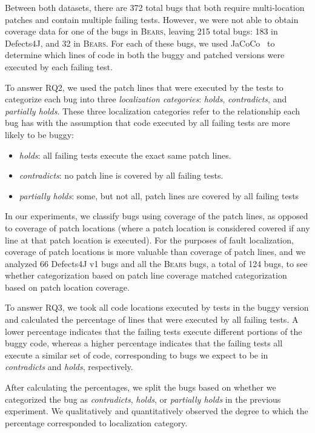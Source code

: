 \documentclass[10pt, conference]{IEEEtran}
\newcommand\bears{\textsc{Bears}\xspace}
\begin{document}
Between both datasets, there are 372 total bugs that both require multi-location
patches and contain multiple failing tests. However, we were not able to obtain coverage 
data for one of the bugs in \bears, leaving 215 total bugs: 183 in Defects4J, and 32 in
\bears. 
For each of these bugs, we used JaCoCo~\cite{jacoco}
to determine which lines of code in both the buggy and patched versions were executed
by each failing test.

To answer RQ2, we used the patch lines that were executed by the tests to categorize 
each bug into three \emph{localization categories}: \emph{holds}, \emph{contradicts}, and 
\emph{partially holds}. These three localization categories refer to the relationship each bug has 
with 
the assumption that code executed by all failing tests are more likely to be buggy: 

\begin{itemize}
\item \emph{holds}:  all failing tests execute the exact same patch lines.
\item \emph{contradicts}: no patch line is covered by all failing tests.
\item \emph{partially holds}: some, but not all, patch lines are covered by all failing tests
\end{itemize}

In our experiments, we classify bugs using coverage of the patch lines, as opposed to 
coverage of 
patch locations (where a patch location is considered covered if any line at that patch location 
is 
executed). For the purposes of fault localization, coverage of patch locations is more valuable 
than coverage of patch lines, and we analyzed 66 Defects4J v1 bugs
 and all the \bears bugs, a total of 124 bugs, to see whether categorization 
based on patch line 
coverage matched categorization based on patch location coverage.

To answer RQ3, we took all code locations executed by tests in the buggy version and
calculated the percentage of lines that were executed by all failing tests. 
A lower percentage indicates that the failing tests execute different portions of the buggy 
code, whereas a higher percentage indicates that the failing tests all execute a similar
set of code, corresponding to bugs we expect to be in \emph{contradicts} and \emph{holds},
respectively.

After calculating the percentages, we split the bugs based on whether we categorized the bug 
as \emph{contradicts}, \emph{holds}, or \emph{partially holds} in the previous experiment.
We qualitatively and quantitatively observed the degree to which the percentage corresponded 
to localization category.
\end{document}
